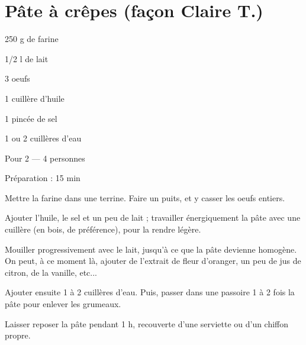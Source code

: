 \section[\normalsize{P\^ate \`a cr\^epes (fa\c con Claire T.)}]{P\^ate \`a cr\^epes (fa\c con Claire T.)}

\begin{ingredients}
\item 250 g de farine
\item 1/2 l de lait
\item 3 oeufs
\item 1 cuill\`ere d'huile
\item 1 pinc\'ee de sel
\item 1 ou 2 cuill\`eres d'eau
\end{ingredients}
\begin{infos}
\item Pour 2 --- 4 personnes
\item Préparation : 15 min
\end{infos}
\begin{etapes}
\item Mettre la farine dans une terrine. Faire un puits, et y casser les oeufs entiers.
\item Ajouter l'huile, le sel et un peu de lait ; travailler \'energiquement la p\^ate avec une cuill\`ere (en bois, de pr\'ef\'erence), pour la rendre l\'eg\`ere.
\item Mouiller progressivement avec le lait, jusqu'\`a ce que la p\^ate devienne homog\`ene. On peut, \`a ce moment l\`a, ajouter de l'extrait de fleur d'oranger, un peu de jus de citron, de la vanille, etc...
\item Ajouter ensuite 1 \`a 2 cuill\`eres d'eau. Puis, passer dans une passoire 1 \`a 2 fois la p\^ate pour enlever les grumeaux.
\item Laisser reposer la p\^ate pendant 1 h, recouverte d'une serviette ou d'un chiffon propre.
\end{etapes}
\begin{conseils}
\end{conseils}
